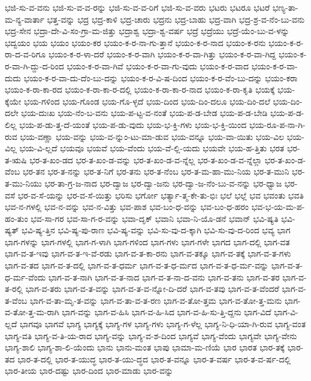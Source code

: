 {ಭಜಿ-ಸು-ವ-ವನು
ಭಜಿ-ಸು-ವ-ವ-ರನ್ನು
ಭಜಿ-ಸು-ವ-ವ-ರಿಗೆ
ಭಜಿ-ಸು-ವ-ವರು
ಭಟರು
ಭಟರೂ
ಭಟರೆ
ಭಣ್ಯ-ತಾ-ಮ-ನ್ಯ-ವಾರ್ತಾ
ಭತ್ತ-ವನ್ನು
ಭದ್ರ
ಭದ್ರ-ಕಾಳಿ
ಭದ್ರ-ಚಾರು
ಭದ್ರನು
ಭದ್ರ-ಬಾಹು
ಭದ್ರ-ವಾಗಿ
ಭದ್ರ-ಶ್ರ-ವ-ನೆಂ-ಬು-ವನು
ಭದ್ರ-ಸೇನ
ಭದ್ರಾ-ದೇ-ವಿ-ಸಂ-ಗ್ರಾ-ಮ-ಜಿತ್ತು
ಭದ್ರಾಶ್ವ
ಭದ್ರಾ-ಶ್ವ-ವರ್ಷ
ಭದ್ರೆ
ಭದ್ರೆಯು
ಭದ್ರೆ-ಯೆಂ-ಬು-ವ-ಳನ್ನು
ಭದ್ವಯಂ
ಭಯ
ಭಯಂ
ಭಯಂ-ಕರ
ಭಯಂ-ಕ-ರ-ನಾ-ಗು-ತ್ತಾನೆ
ಭಯಂ-ಕ-ರ-ನಾದ
ಭಯಂ-ಕ-ರನು
ಭಯಂ-ಕ-ರ-ರಾ-ದ-ವ-ರಿಗೂ
ಭಯಂ-ಕ-ರ-ಳಾ-ದರೆ
ಭಯಂ-ಕ-ರ-ವಾಗಿ
ಭಯಂ-ಕ-ರ-ವಾ-ಗಿತ್ತು
ಭಯಂ-ಕ-ರ-ವಾ-ಗಿದ್ದ
ಭಯಂ-ಕ-ರ-ವಾ-ಗಿ-ದ್ದು-ದ-ರಿಂದ
ಭಯಂ-ಕ-ರ-ವಾ-ಗಿವೆ
ಭಯಂ-ಕ-ರ-ವಾ-ಗು-ವುದು
ಭಯಂ-ಕ-ರ-ವಾದ
ಭಯಂ-ಕ-ರ-ವಾ-ದುದು
ಭಯಂ-ಕ-ರ-ವಾ-ದು-ದೆಂ-ಬು-ದನ್ನು
ಭಯಂ-ಕ-ರ-ವಿ-ಷ-ದಿಂದ
ಭಯಂ-ಕ-ರ-ವೆಂ-ಬು-ದನ್ನು
ಭಯಂ-ಕರಾ
ಭಯಂ-ಕ-ರಾ-ಕಾ-ರದ
ಭಯಂ-ಕ-ರಾ-ಕಾ-ರ-ದಲ್ಲಿ
ಭಯಂ-ಕ-ರಾ-ಕಾ-ರ-ನಾದ
ಭಯಂ-ಕ-ರಾ-ಕೃತಿ
ಭಯಕ್ಕೆ
ಭಯ-ಕ್ಕೆಯೇ
ಭಯ-ಗಳಿಂದ
ಭಯ-ಗೊಂಡ
ಭಯ-ಗೊ-ಳ್ಳದೆ
ಭಯ-ದಿಂದ
ಭಯ-ದಿಂ-ದಲೂ
ಭಯ-ದಿಂ-ದಲೆ
ಭಯ-ದಿಂ-ದಲೇ
ಭಯ-ದುಃಖ
ಭಯ-ನೆಂ-ಬ-ವನು
ಭಯ-ಪ-ಟ್ಟ-ವ-ನಂತೆ
ಭಯ-ಪ-ಡ-ಬೇಡ
ಭಯ-ಪ-ಡ-ಬೇಡಿ
ಭಯ-ಪ-ಡ-ಲಿಲ್ಲ
ಭಯ-ಪ-ಡು-ತ್ತ-ದೆ-ಯಂತೆ
ಭಯ-ಪ-ಡು-ವುದು
ಭಯ-ಭ-ಕ್ತಿ-ಗಳು
ಭಯ-ಭ-ಕ್ತಿ-ಯಿಂದ
ಭಯ-ರೂ-ಪ-ನಾ-ಗಿ-ರುವ
ಭಯ-ವಣ್ಣಾ
ಭಯ-ವನ್ನು
ಭಯ-ವ-ನ್ನುಂ-ಟು-ಮಾ-ಡುವ
ಭಯ-ವನ್ನೂ
ಭಯ-ವಾ-ಯಿತು
ಭಯ-ವಿಲ
ಭಯ-ವಿಲ್ಲ
ಭಯ-ವಿ-ಲ್ಲದೆ
ಭಯವೂ
ಭಯವೆ
ಭಯ-ವೆಂದು
ಭಯ-ವೆ-ಲ್ಲಿ-ಯದು
ಭಯವೇ
ಭಯ-ಹ-ತ್ತಿತು
ಭರತ
ಭರ-ತ-ಋಷಿ
ಭರ-ತ-ಖಂ-ಡದ
ಭರ-ತ-ಖಂ-ಡ-ವನ್ನು
ಭರ-ತ-ಖಂ-ಡ-ವ-ನ್ನೆಲ್ಲ
ಭರ-ತ-ಖಂ-ಡ-ವ-ನ್ನೆಲ್ಲಾ
ಭರ-ತ-ಖಂ-ಡ-ವೆಂಬ
ಭರ-ತನ
ಭರ-ತ-ನನ್ನು
ಭರ-ತ-ನಿಗೆ
ಭರ-ತನು
ಭರ-ತ-ನೆಂಬ
ಭರ-ತ-ಮ-ಹಾ-ಮು-ನಿಯ
ಭರ-ತ-ಮುನಿ
ಭರ-ತ-ಮು-ನಿಯು
ಭರ-ತಾ-ಗ್ರ-ಜ-ನಾದ
ಭರ-ದ್ವಾಜ
ಭರ-ದ್ವಾ-ಜನು
ಭರ-ದ್ವಾ-ಜ-ನೆಂ-ಬು-ವ-ನನ್ನು
ಭರ-ಧ್ವಾಜ
ಭರ-ವಸೆ
ಭರ-ವ-ಸೆ-ಯನ್ನು
ಭರ-ವ-ಸೆ-ಯಿತ್ತು
ಭರಿಸು
ಭರ್ಗೋ
ಭರ್ತ್ಯಾ-ತ್ಮ-ಕೇ-ತು-ಭಿಃ
ಭಲೆ
ಭಲ್ಲೆ
ಭವ
ಭವಂತು
ಭವತಿ
ಭವ-ನ-ಗಳಲ್ಲಿ
ಭವ-ನ-ವನ್ನು
ಭವ-ನ-ವಿತ್ತು
ಭವ-ಪಾಶ
ಭವ-ಬಂ-ಧ-ವನ್ನು
ಭವ-ಬಂ-ಧ-ಹರಂ
ಭವ-ಭ-ಯ-ಮ-ಪ-ಹಂ-ತುಂ
ಭವ-ಸಾ-ಗರ
ಭವ-ಸಾ-ಗ-ರ-ವನ್ನು
ಭವಾ-ದೃಕ್
ಭವಾನಿ
ಭವಾ-ನಿ-ಯೊ-ಡನೆ
ಭವಾನ್
ಭವಿ-ಷ್ಯತಿ
ಭವಿ-ಷ್ಯತ್
ಭವಿ-ಷ್ಯ-ತ್ತಿನ
ಭವಿ-ಷ್ಯ-ಪು-ರಾಣ
ಭವಿ-ಷ್ಯ-ವನ್ನು
ಭವಿ-ಸು-ವು-ದ-ಕ್ಕಾಗಿ
ಭವಿ-ಸು-ವು-ದ-ರಿಂದ
ಭವ್ಯ
ಭಾಗ
ಭಾಗ-ಗಳನ್ನು
ಭಾಗ-ಗಳಲ್ಲಿ
ಭಾಗ-ಗ-ಳಾಗಿ
ಭಾಗ-ಗಳಿಂದ
ಭಾಗ-ಗಳು
ಭಾಗ-ಗಳೇ
ಭಾಗದ
ಭಾಗ-ದಲ್ಲಿ
ಭಾಗ-ವತ
ಭಾಗ-ವ-ತ-ಇವು
ಭಾಗ-ವ-ತ-ಇ-ವೆ-ರಡು
ಭಾಗ-ವ-ತ-ಕಾ-ರನು
ಭಾಗ-ವ-ತಕ್ಕೂ
ಭಾಗ-ವ-ತಕ್ಕೆ
ಭಾಗ-ವ-ತ-ಗಳು
ಭಾಗ-ವ-ತದ
ಭಾಗ-ವ-ತ-ದಲ್ಲಿ
ಭಾಗ-ವ-ತ-ಧರ್ಮ
ಭಾಗ-ವ-ತ-ಧ-ರ್ಮದ
ಭಾಗ-ವ-ತ-ಧ-ರ್ಮ-ವನ್ನು
ಭಾಗ-ವ-ತ-ಧ-ರ್ಮ-ವೆಂದು
ಭಾಗ-ವ-ತ-ನಾಗಿ
ಭಾಗ-ವ-ತ-ನಾದ
ಭಾಗ-ವ-ತ-ನಾ-ದ-ವನು
ಭಾಗ-ವ-ತನು
ಭಾಗ-ವ-ತರ
ಭಾಗ-ವ-ತ-ರಲ್ಲಿ
ಭಾಗ-ವ-ತರು
ಭಾಗ-ವ-ತ-ವನ್ನು
ಭಾಗ-ವ-ತ-ವ-ನ್ನೋ-ದಿ-ದರೆ
ಭಾಗ-ವ-ತವು
ಭಾಗ-ವ-ತ-ವೆಂದರೆ
ಭಾಗ-ವ-ತ-ವೆಂಬ
ಭಾಗ-ವ-ತಾ-ಮೃ-ತ-ವನ್ನು
ಭಾಗ-ವ-ತಾ-ವ-ತ-ರಣ
ಭಾಗ-ವ-ತೋ-ತ್ತಮ
ಭಾಗ-ವ-ತೋ-ತ್ತ-ಮನು
ಭಾಗ-ವ-ತೋ-ತ್ತ-ಮ-ರಾಗಿ
ಭಾಗ-ವನ್ನು
ಭಾಗ-ವ-ಹಿಸಿ
ಭಾಗ-ವ-ಹಿ-ಸಿದ
ಭಾಗ-ವ-ಹಿ-ಸು-ತ್ತಿ-ದ್ದನು
ಭಾಗ-ವಿದೆ
ಭಾಗ-ವಿ-ಲ್ಲದೆ
ಭಾಗವೂ
ಭಾಗವೆ
ಭಾಗ್ಯ
ಭಾಗ್ಯಕ್ಕೆ
ಭಾಗ್ಯ-ಗಳ
ಭಾಗ್ಯ-ಗಳು
ಭಾಗ್ಯ-ಗ-ಳೆಲ್ಲ
ಭಾಗ್ಯ-ನಿ-ಧಿ-ಯಾ-ಗಿ-ರುವ
ಭಾಗ್ಯ-ವಂತ
ಭಾಗ್ಯ-ವತಿ
ಭಾಗ್ಯ-ವ-ತಿ-ಯ-ರಾದ
ಭಾಗ್ಯ-ವನ್ನು
ಭಾಗ್ಯ-ವ-ಶ-ದಿಂದ
ಭಾಗ್ಯವೆ
ಭಾಗ್ಯ-ವೆಂದು
ಭಾಗ್ಯವೇ
ಭಾಗ್ಯ-ವೇನು
ಭಾಗ್ಯ-ಶಾಲಿ
ಭಾಗ್ಯ-ಶಾ-ಲಿ-ಯೆಂದು
ಭಾನು
ಭಾನು-ಮಂತ
ಭಾಪು
ಭಾಮಾ-ಮ-ಣಿಯೆ
ಭಾರ
ಭಾರತ
ಭಾರ-ತಕ್ಕೆ
ಭಾರ-ತದ
ಭಾರ-ತ-ದಲ್ಲಿ
ಭಾರ-ತ-ಯುದ್ಧ
ಭಾರ-ತ-ಯು-ದ್ಧದ
ಭಾರ-ತ-ವನ್ನೂ
ಭಾರ-ತ-ವರ್ಷ
ಭಾರ-ತ-ವ-ರ್ಷ-ದಲ್ಲಿ
ಭಾರ-ತೀಯ
ಭಾರ-ದಷ್ಟು
ಭಾರ-ದಿಂದ
ಭಾರ-ಮಾಡು
ಭಾರ-ವನ್ನು
}
